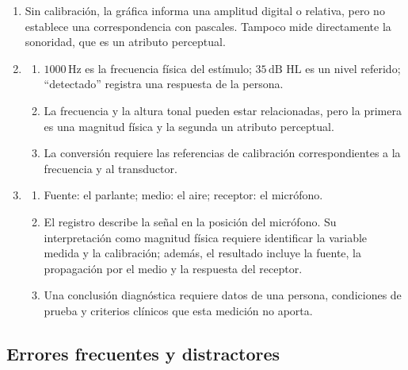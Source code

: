 \begin{enumerate}[label=\textbf{F\arabic*.},leftmargin=*]
    \item Sin calibración, la gráfica informa una amplitud digital o relativa, pero no establece una correspondencia con pascales. Tampoco mide directamente la sonoridad, que es un atributo perceptual.

    \item
    \begin{enumerate}[label=\alph*)]
        \item \(1000\,\text{Hz}\) es la frecuencia física del estímulo; \(35\,\text{dB HL}\) es un nivel referido; ``detectado'' registra una respuesta de la persona.
        \item La frecuencia y la altura tonal pueden estar relacionadas, pero la primera es una magnitud física y la segunda un atributo perceptual.
        \item La conversión requiere las referencias de calibración correspondientes a la frecuencia y al transductor.
    \end{enumerate}

    \item
    \begin{enumerate}[label=\alph*)]
        \item Fuente: el parlante; medio: el aire; receptor: el micrófono.
        \item El registro describe la señal en la posición del micrófono. Su interpretación como magnitud física requiere identificar la variable medida y la calibración; además, el resultado incluye la fuente, la propagación por el medio y la respuesta del receptor.
        \item Una conclusión diagnóstica requiere datos de una persona, condiciones de prueba y criterios clínicos que esta medición no aporta.
    \end{enumerate}
\end{enumerate}

\subsection*{Errores frecuentes y distractores}

